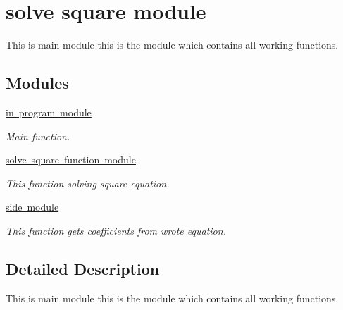 \hypertarget{group__main__module}{}\section{solve square module}
\label{group__main__module}


This is main module this is the module which contains all working functions.  


\subsection*{Modules}
\begin{DoxyCompactItemize}
\item 
\mbox{\hyperlink{group__third__module}{in program module}}
\begin{DoxyCompactList}\small\item\em Main function. \end{DoxyCompactList}\item 
\mbox{\hyperlink{group__first__module}{solve square function module}}
\begin{DoxyCompactList}\small\item\em This function solving square equation. \end{DoxyCompactList}\item 
\mbox{\hyperlink{group__second__module}{side module}}
\begin{DoxyCompactList}\small\item\em This function get\textquotesingle{}s coefficients from wrote equation. \end{DoxyCompactList}\end{DoxyCompactItemize}


\subsection{Detailed Description}
This is main module this is the module which contains all working functions. 

